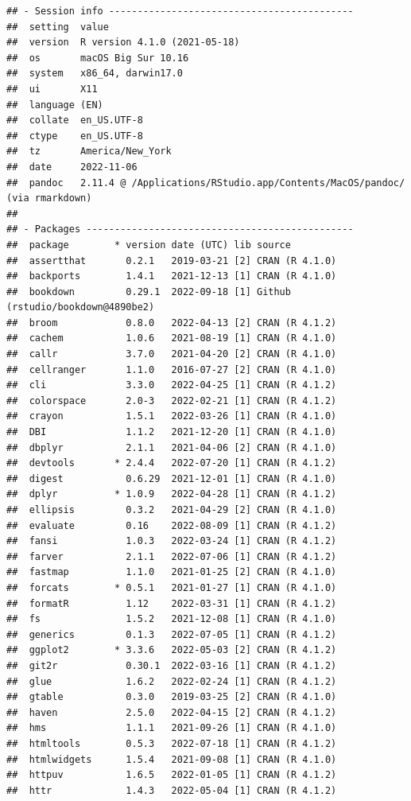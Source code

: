 \documentclass[print]{nuthesis}
\begin{document}
\begin{verbatim}
## - Session info -------------------------------------------
##  setting  value
##  version  R version 4.1.0 (2021-05-18)
##  os       macOS Big Sur 10.16
##  system   x86_64, darwin17.0
##  ui       X11
##  language (EN)
##  collate  en_US.UTF-8
##  ctype    en_US.UTF-8
##  tz       America/New_York
##  date     2022-11-06
##  pandoc   2.11.4 @ /Applications/RStudio.app/Contents/MacOS/pandoc/ (via rmarkdown)
## 
## - Packages -----------------------------------------------
##  package        * version date (UTC) lib source
##  assertthat       0.2.1   2019-03-21 [2] CRAN (R 4.1.0)
##  backports        1.4.1   2021-12-13 [1] CRAN (R 4.1.0)
##  bookdown         0.29.1  2022-09-18 [1] Github (rstudio/bookdown@4890be2)
##  broom            0.8.0   2022-04-13 [2] CRAN (R 4.1.2)
##  cachem           1.0.6   2021-08-19 [1] CRAN (R 4.1.0)
##  callr            3.7.0   2021-04-20 [2] CRAN (R 4.1.0)
##  cellranger       1.1.0   2016-07-27 [2] CRAN (R 4.1.0)
##  cli              3.3.0   2022-04-25 [1] CRAN (R 4.1.2)
##  colorspace       2.0-3   2022-02-21 [1] CRAN (R 4.1.2)
##  crayon           1.5.1   2022-03-26 [1] CRAN (R 4.1.0)
##  DBI              1.1.2   2021-12-20 [1] CRAN (R 4.1.0)
##  dbplyr           2.1.1   2021-04-06 [2] CRAN (R 4.1.0)
##  devtools       * 2.4.4   2022-07-20 [1] CRAN (R 4.1.2)
##  digest           0.6.29  2021-12-01 [1] CRAN (R 4.1.0)
##  dplyr          * 1.0.9   2022-04-28 [1] CRAN (R 4.1.2)
##  ellipsis         0.3.2   2021-04-29 [2] CRAN (R 4.1.0)
##  evaluate         0.16    2022-08-09 [1] CRAN (R 4.1.2)
##  fansi            1.0.3   2022-03-24 [1] CRAN (R 4.1.2)
##  farver           2.1.1   2022-07-06 [1] CRAN (R 4.1.2)
##  fastmap          1.1.0   2021-01-25 [2] CRAN (R 4.1.0)
##  forcats        * 0.5.1   2021-01-27 [1] CRAN (R 4.1.0)
##  formatR          1.12    2022-03-31 [1] CRAN (R 4.1.2)
##  fs               1.5.2   2021-12-08 [1] CRAN (R 4.1.0)
##  generics         0.1.3   2022-07-05 [1] CRAN (R 4.1.2)
##  ggplot2        * 3.3.6   2022-05-03 [2] CRAN (R 4.1.2)
##  git2r            0.30.1  2022-03-16 [1] CRAN (R 4.1.2)
##  glue             1.6.2   2022-02-24 [1] CRAN (R 4.1.2)
##  gtable           0.3.0   2019-03-25 [2] CRAN (R 4.1.0)
##  haven            2.5.0   2022-04-15 [2] CRAN (R 4.1.2)
##  hms              1.1.1   2021-09-26 [1] CRAN (R 4.1.0)
##  htmltools        0.5.3   2022-07-18 [1] CRAN (R 4.1.2)
##  htmlwidgets      1.5.4   2021-09-08 [1] CRAN (R 4.1.0)
##  httpuv           1.6.5   2022-01-05 [1] CRAN (R 4.1.2)
##  httr             1.4.3   2022-05-04 [1] CRAN (R 4.1.2)

\end{verbatim}
\end{document}

